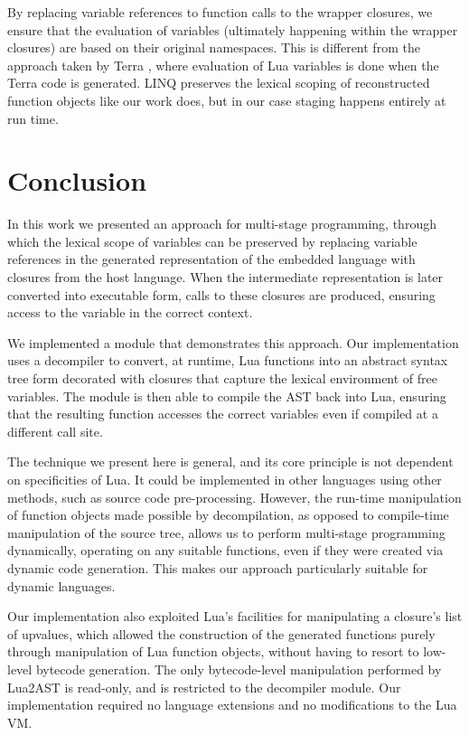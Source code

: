 \documentclass[english]{llncs}
\begin{document}
By replacing variable references to function
calls to the wrapper closures, we ensure that the evaluation of variables
(ultimately happening within the wrapper closures) are based on their
original namespaces. This is different from the approach taken by
Terra \cite{DeVito2013Terra}, where evaluation of Lua variables
is done when the Terra code is generated. LINQ \cite{linq} preserves
the lexical scoping of reconstructed function objects like our work does,
but in our case staging happens entirely at run time.

\section{Conclusion}
\label{sec:conclusion}

In this work we presented an approach for multi-stage programming, through
which the lexical scope of variables can be preserved by replacing
variable references in the generated representation of the embedded language
with closures from the host language. When the intermediate representation
is later converted into executable form, calls to these closures are
produced, ensuring access to the variable in the correct context.

We implemented a module that demonstrates this approach.
Our implementation uses a decompiler to convert, at runtime, Lua
functions into an abstract syntax tree form decorated with
closures that capture the lexical environment of free variables.
The module is then able to compile the AST back into Lua,
ensuring that the resulting function accesses the correct variables
even if compiled at a different call site.

The technique we present here is general, and its core principle
is not dependent on specificities of Lua. It could be implemented in other
languages using other methods, such as source code pre-processing. However,
the run-time manipulation of function objects made possible by decompilation,
as opposed to compile-time manipulation of the source tree, allows us to
perform multi-stage programming dynamically, operating on any suitable
functions, even if they were created via dynamic code generation. This makes
our approach particularly suitable for dynamic languages.

Our implementation also exploited Lua's facilities for manipulating
a closure's list of upvalues, which allowed the construction of the
generated functions purely through manipulation of Lua function
objects, without having to resort to low-level bytecode generation.
The only bytecode-level manipulation performed by Lua2AST is
read-only, and is restricted to the decompiler module. Our implementation
required no language extensions and no modifications to the Lua VM.
\end{document}
